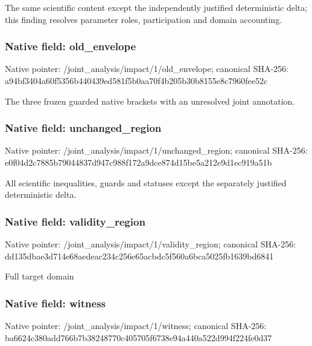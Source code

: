 \documentclass[10pt,a4paper]{article}
\begin{document}
\begingroup\raggedright\sloppy The same scientific content except the independently justified deterministic delta;\allowbreak{} this finding resolves parameter roles,\allowbreak{} participation and domain accounting.\par\endgroup

\subsubsection{Native field: old\_\allowbreak{}envelope}
Native pointer: /joint\_\allowbreak{}analysis/impact/1/old\_\allowbreak{}envelope; canonical SHA-256: a94bf3404a60f5356b440439ed581f5b0aa70f4b205b30b8155e8c7960fee52c

\begingroup\raggedright\sloppy The three frozen guarded native brackets with an unresolved joint annotation.\par\endgroup

\subsubsection{Native field: unchanged\_\allowbreak{}region}
Native pointer: /joint\_\allowbreak{}analysis/impact/1/unchanged\_\allowbreak{}region; canonical SHA-256: e0f04d2c7885b79044837d947c988f172a9dce874d15be5a212e9d1ec919a51b

\begingroup\raggedright\sloppy All scientific inequalities,\allowbreak{} guards and statuses except the separately justified deterministic delta.\par\endgroup

\subsubsection{Native field: validity\_\allowbreak{}region}
Native pointer: /joint\_\allowbreak{}analysis/impact/1/validity\_\allowbreak{}region; canonical SHA-256: dd135dbae3d714e68aedeac234c256e65acbdc5f560a6bca5025fb1639bd6841

\begingroup\raggedright\sloppy Full target domain\par\endgroup

\subsubsection{Native field: witness}
Native pointer: /joint\_\allowbreak{}analysis/impact/1/witness; canonical SHA-256: ba6624c380add766b7b38248770c405705f6738e94a440a522d994f224fe0d37
\end{document}
